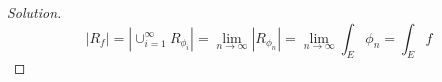 \documentclass[10pt]{article}
\begin{document}
\begin{proof}[Solution]
$$| R_f| =  |\cup_{i=1}^\infty R_{\phi_i}| = \lim_{n \to \infty} | R_{\phi_n} | = \lim_{n \to \infty} \int_E \phi_n = \int_E f$$



\end{proof}
\end{document}
